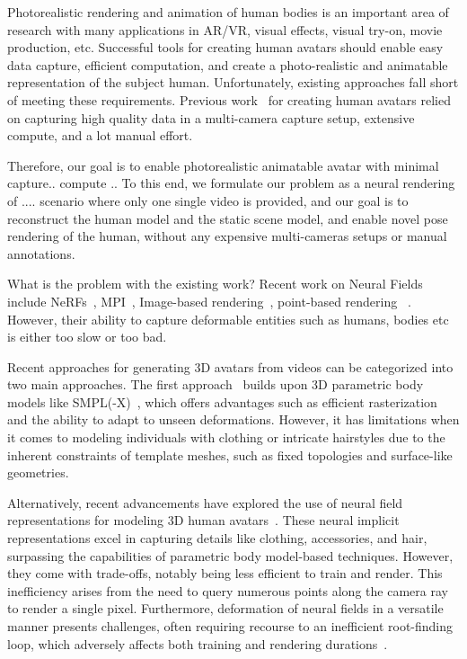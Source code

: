Photorealistic rendering and animation of human bodies is an important area of research with many applications in AR/VR, visual effects, visual try-on, movie production, etc. Successful tools for creating human avatars should enable easy data capture, efficient computation, and create a photo-realistic and animatable representation of the subject human. Unfortunately, existing approaches fall short of meeting these requirements. Previous work~\cite{alexander2010emily, alexander2013digitalira} for creating human avatars relied on capturing high quality data in a multi-camera capture setup, extensive compute, and a lot manual effort.

Therefore, our goal is to enable photorealistic animatable avatar with minimal capture.. compute .. To this end, we formulate our problem as a neural rendering of ....
scenario where only one single video is provided, and our goal is to reconstruct the human model and the static scene model, and enable novel pose rendering of the human, without any expensive multi-cameras setups or manual annotations. 

What is the problem with the existing work?
Recent work on Neural Fields include NeRFs~\cite{mildenhall2020nerf}, MPI~\cite{}, Image-based rendering~\cite{IBR_stuff}, point-based rendering ~\cite{adop, pointersect, pulsar}. However, their ability to capture deformable entities such as humans, bodies etc is either too slow or too bad. 

%
Recent approaches for generating 3D avatars from videos can be categorized into two main approaches. The first approach~\cite{} builds upon 3D parametric body models like SMPL(-X)~\cite{}, which offers advantages such as efficient rasterization and the ability to adapt to unseen deformations. However, it has limitations when it comes to modeling individuals with clothing or intricate hairstyles due to the inherent constraints of template meshes, such as fixed topologies and surface-like geometries.

Alternatively, recent advancements have explored the use of neural field representations for modeling 3D human avatars~\cite{jiang2022neuman}. These neural implicit representations excel in capturing details like clothing, accessories, and hair, surpassing the capabilities of parametric body model-based techniques. However, they come with trade-offs, notably being less efficient to train and render. 
This inefficiency arises from the need to query numerous points along the camera ray to render a single pixel. 
Furthermore, deformation of neural fields in a versatile manner presents challenges, often requiring recourse to an inefficient root-finding loop, which adversely affects both training and rendering durations~\cite{}.

